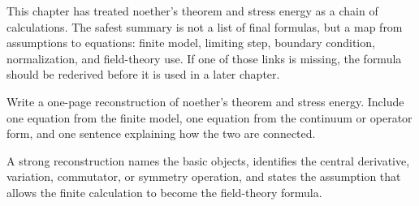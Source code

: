 This chapter has treated noether's theorem and stress energy as a chain of calculations.  The safest summary is not a list of final formulas, but a map from assumptions to equations: finite model, limiting step, boundary condition, normalization, and field-theory use.  If one of those links is missing, the formula should be rederived before it is used in a later chapter.

\begin{exercise}
Write a one-page reconstruction of noether's theorem and stress energy.  Include one equation from the finite model, one equation from the continuum or operator form, and one sentence explaining how the two are connected.
\begin{answer}
A strong reconstruction names the basic objects, identifies the central derivative, variation, commutator, or symmetry operation, and states the assumption that allows the finite calculation to become the field-theory formula.
\end{answer}
\end{exercise}
